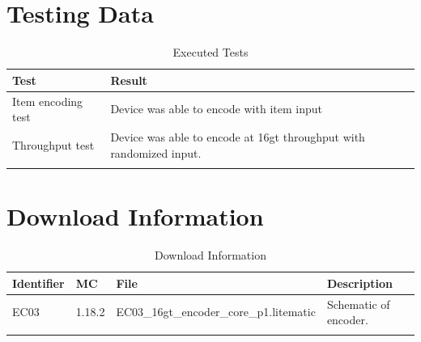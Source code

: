 \documentclass[10pt]{datasheet}
\begin{document}
\section{Testing Data}
\begin{table}[h]
\caption{Executed Tests}
\begin{tabularx}{\textwidth}{l | X}
    \thickhline
    \textbf{Test} & \textbf{Result} \\
    \hline
    Item encoding test & Device was able to encode with item input \\
    \hline
    Throughput test & Device was able to encode at 16gt throughput with randomized input. \\
    \thickhline
\end{tabularx}
\end{table}

\section{Download Information}
\begin{table}[h]
    \caption{Download Information}
    \begin{tabularx}{\textwidth}{l | l | l | X}
        \thickhline
        \textbf{Identifier} & \textbf{MC} & \textbf{File} & \textbf{Description} \\
        \hline
        EC03 & 1.18.2 & EC03\_16gt\_encoder\_core\_p1.litematic & Schematic of encoder. \\
        \hline
        \thickhline
    \end{tabularx}
\end{table}
\end{document}
